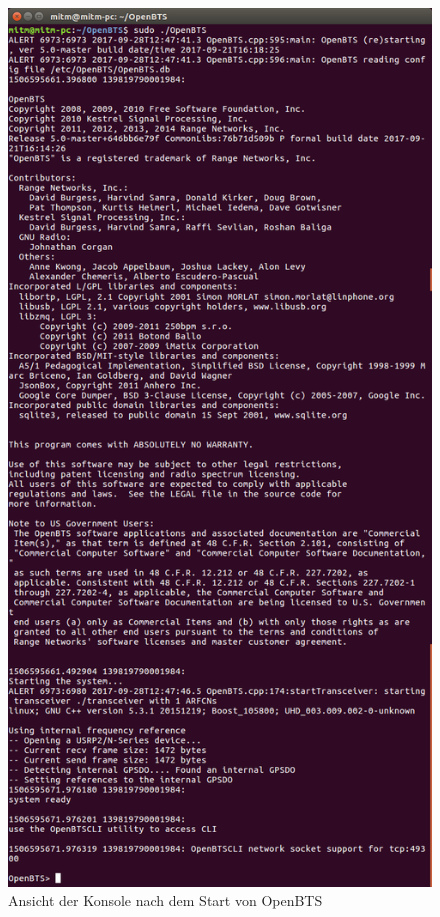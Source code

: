 \begin{figure}[htbp]
	\centering
		\includegraphics[width=1.00\textwidth]{includes/Start_OpenBTS}
	\caption{Ansicht der Konsole nach dem Start von OpenBTS}
	\label{fig:start_OpenBTS}
\end{figure}

